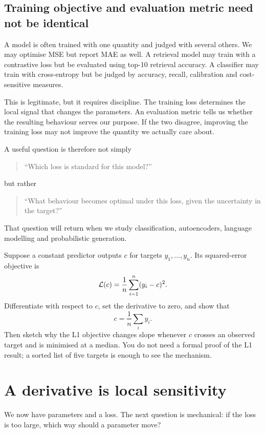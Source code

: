\subsection{Training objective and evaluation metric need not be identical}

A model is often trained with one quantity and judged with several others. We may optimise MSE but report MAE as well. A retrieval model may train with a contrastive loss but be evaluated using top-10 retrieval accuracy. A classifier may train with cross-entropy but be judged by accuracy, recall, calibration and cost-sensitive measures.

This is legitimate, but it requires discipline. The training loss determines the local signal that changes the parameters. An evaluation metric tells us whether the resulting behaviour serves our purpose. If the two disagree, improving the training loss may not improve the quantity we actually care about.

A useful question is therefore not simply
\begin{quote}
``Which loss is standard for this model?''
\end{quote}
but rather
\begin{quote}
``What behaviour becomes optimal under this loss, given the uncertainty in the target?''
\end{quote}

That question will return when we study classification, autoencoders, language modelling and probabilistic generation.

\begin{optionalexercise}[title={Optional mathematics --- why MSE chooses the mean}]
Suppose a constant predictor outputs \(c\) for targets \(y_1,\ldots,y_n\). Its squared-error objective is
\[
  \mathcal{L}(c)=\frac{1}{n}\sum_{i=1}^{n}(y_i-c)^2.
\]
Differentiate with respect to \(c\), set the derivative to zero, and show that
\[
  c=\frac{1}{n}\sum_i y_i.
\]
Then sketch why the L1 objective changes slope whenever \(c\) crosses an observed target and is minimised at a median. You do not need a formal proof of the L1 result; a sorted list of five targets is enough to see the mechanism.
\end{optionalexercise}

\section{A derivative is local sensitivity}

We now have parameters and a loss. The next question is mechanical: if the loss is too large, which way should a parameter move?

